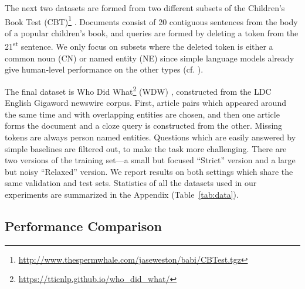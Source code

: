 \documentclass[11pt,a4paper]{article}
\begin{document}
The next two datasets are formed from two different subsets of the Children's Book Test (CBT)\footnote{\scriptsize \url{http://www.thespermwhale.com/jaseweston/babi/CBTest.tgz}} \citep{hill2015goldilocks}. Documents consist of 20 contiguous sentences from the body of a popular children's book, and queries are formed by deleting a token from the 21\textsuperscript{st} sentence. We only focus on subsets where the deleted token is either a common noun (CN) or named entity (NE) since simple language models already give human-level performance on the other types (cf. \citep{hill2015goldilocks}).

The final dataset is Who Did What\footnote{\scriptsize \url{ https://tticnlp.github.io/who_did_what/}} (WDW) \citep{onishi2016did},
constructed from the LDC English Gigaword newswire corpus.
First, article pairs which appeared around the same time and with overlapping entities are chosen, and then one article forms the document and a cloze query is constructed from the other. Missing tokens are always person named entities.
Questions which are easily answered by simple baselines are filtered out,
to make the task more challenging. There are two versions of the training set---a small but focused ``Strict'' version and a large but noisy ``Relaxed'' version.
We report results on both settings which share the same validation and test sets. Statistics of all the datasets used in our experiments are summarized in the Appendix (Table~\ref{tab:data}).

\subsection{Performance Comparison}
\end{document}
